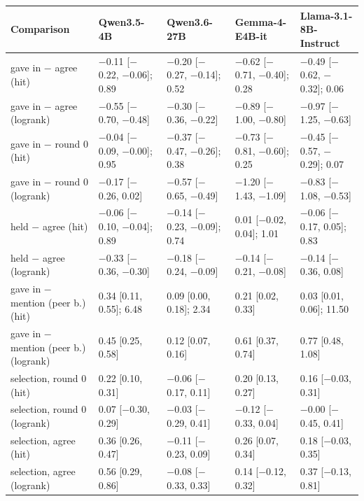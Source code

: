 \begin{tabular}{lllll}
\toprule
Comparison & Qwen3.5-4B & Qwen3.6-27B & Gemma-4-E4B-it & Llama-3.1-8B-Instruct \\
\midrule
gave in $-$ agree (hit) & $-$0.11 [$-$0.22, $-$0.06]; 0.89 & $-$0.20 [$-$0.27, $-$0.14]; 0.52 & $-$0.62 [$-$0.71, $-$0.40]; 0.28 & $-$0.49 [$-$0.62, $-$0.32]; 0.06 \\
gave in $-$ agree (logrank) & $-$0.55 [$-$0.70, $-$0.48] & $-$0.30 [$-$0.36, $-$0.22] & $-$0.89 [$-$1.00, $-$0.80] & $-$0.97 [$-$1.25, $-$0.63] \\
gave in $-$ round 0 (hit) & $-$0.04 [$-$0.09, $-$0.00]; 0.95 & $-$0.37 [$-$0.47, $-$0.26]; 0.38 & $-$0.73 [$-$0.81, $-$0.60]; 0.25 & $-$0.45 [$-$0.57, $-$0.29]; 0.07 \\
gave in $-$ round 0 (logrank) & $-$0.17 [$-$0.26, 0.02] & $-$0.57 [$-$0.65, $-$0.49] & $-$1.20 [$-$1.43, $-$1.09] & $-$0.83 [$-$1.08, $-$0.53] \\
held $-$ agree (hit) & $-$0.06 [$-$0.10, $-$0.04]; 0.89 & $-$0.14 [$-$0.23, $-$0.09]; 0.74 & 0.01 [$-$0.02, 0.04]; 1.01 & $-$0.06 [$-$0.17, 0.05]; 0.83 \\
held $-$ agree (logrank) & $-$0.33 [$-$0.36, $-$0.30] & $-$0.18 [$-$0.24, $-$0.09] & $-$0.14 [$-$0.21, $-$0.08] & $-$0.14 [$-$0.36, 0.08] \\
gave in $-$ mention (peer b.) (hit) & 0.34 [0.11, 0.55]; 6.48 & 0.09 [0.00, 0.18]; 2.34 & 0.21 [0.02, 0.33] & 0.03 [0.01, 0.06]; 11.50 \\
gave in $-$ mention (peer b.) (logrank) & 0.45 [0.25, 0.58] & 0.12 [0.07, 0.16] & 0.61 [0.37, 0.74] & 0.77 [0.48, 1.08] \\
\midrule
selection, round 0 (hit) & 0.22 [0.10, 0.31] & $-$0.06 [$-$0.17, 0.11] & 0.20 [0.13, 0.27] & 0.16 [$-$0.03, 0.31] \\
selection, round 0 (logrank) & 0.07 [$-$0.30, 0.29] & $-$0.03 [$-$0.29, 0.41] & $-$0.12 [$-$0.33, 0.04] & $-$0.00 [$-$0.45, 0.41] \\
selection, agree (hit) & 0.36 [0.26, 0.47] & $-$0.11 [$-$0.23, 0.09] & 0.26 [0.07, 0.34] & 0.18 [$-$0.03, 0.35] \\
selection, agree (logrank) & 0.56 [0.29, 0.86] & $-$0.08 [$-$0.33, 0.33] & 0.14 [$-$0.12, 0.32] & 0.37 [$-$0.13, 0.81] \\
\bottomrule
\end{tabular}
